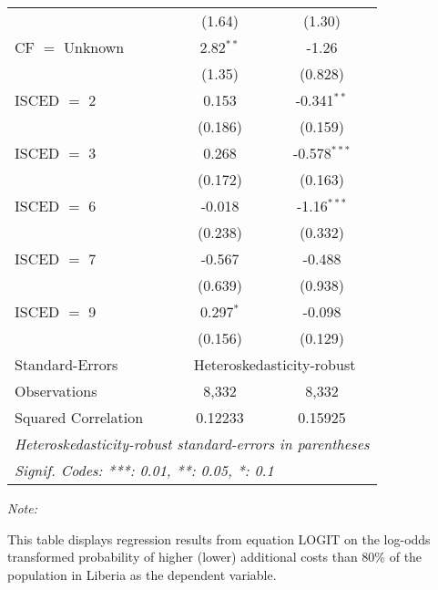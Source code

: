 \begin{table}[htbp!]
\begin{adjustbox}{width = 1\textwidth, max height = 0.95\textheight, center}
\begin{threeparttable}[b]
\begin{tabular}{lcc}
                                 & (1.64)        & (1.30)\\   
            CF $=$ Unknown       & 2.82$^{**}$   & -1.26\\   
                                 & (1.35)        & (0.828)\\   
            ISCED $=$ 2          & 0.153         & -0.341$^{**}$\\   
                                 & (0.186)       & (0.159)\\   
            ISCED $=$ 3          & 0.268         & -0.578$^{***}$\\   
                                 & (0.172)       & (0.163)\\   
            ISCED $=$ 6          & -0.018        & -1.16$^{***}$\\   
                                 & (0.238)       & (0.332)\\   
            ISCED $=$ 7          & -0.567        & -0.488\\   
                                 & (0.639)       & (0.938)\\   
            ISCED $=$ 9          & 0.297$^{*}$   & -0.098\\   
                                 & (0.156)       & (0.129)\\   
            \midrule 
            Standard-Errors & \multicolumn{2}{c}{Heteroskedasticity-robust} \\ 
            Observations         & 8,332         & 8,332\\  
            Squared Correlation  & 0.12233       & 0.15925\\  
            \midrule \midrule
            \multicolumn{3}{l}{\emph{Heteroskedasticity-robust standard-errors in parentheses}}\\
            \multicolumn{3}{l}{\emph{Signif. Codes: ***: 0.01, **: 0.05, *: 0.1}}\\
         \end{tabular}
         
         \begin{tablenotes}\item \medskip \textit{Note:}
            \item This table displays regression results from equation LOGIT on the log-odds transformed probability of higher (lower) additional costs than 80\% of the population in Liberia as the dependent variable. 
         \end{tablenotes}
      \end{threeparttable}
   \end{adjustbox}
\end{table}


